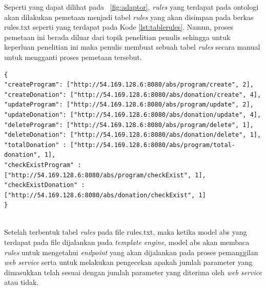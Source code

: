 Seperti yang dapat dilihat pada \pic~\ref{fig:adaptor}, \textit{rules} yang terdapat pada ontologi akan dilakukan pemetaan menjadi tabel \textit{rules} yang akan disimpan pada berkas rules.txt seperti yang terdapat pada Kode \ref{lst:tablerules}. Namun, proses pemetaan ini berada diluar dari topik penelitian penulis sehingga untuk keperluan penelitian ini maka penulis membuat sebuah tabel \textit{rules} secara manual untuk mengganti proses pemetaan tersebut.

\begin{minipage}{\linewidth}
\begin{lstlisting}[caption={Contoh tabel \textit{rules}},label={lst:tablerules}]
{
"createProgram": ["http://54.169.128.6:8080/abs/program/create", 2],
"createDonation": ["http://54.169.128.6:8080/abs/donation/create", 4],
"updateProgram": ["http://54.169.128.6:8080/abs/program/update", 2],
"updateDonation": ["http://54.169.128.6:8080/abs/donation/update", 4],
"deleteProgram": ["http://54.169.128.6:8080/abs/program/delete", 1],
"deleteDonation": ["http://54.169.128.6:8080/abs/donation/delete", 1],
"totalDonation" : ["http://54.169.128.6:8080/abs/program/total-donation", 1],
"checkExistProgram" : ["http://54.169.128.6:8080/abs/program/checkExist", 1],
"checkExistDonation" : ["http://54.169.128.6:8080/abs/donation/checkExist", 1]
}
\end{lstlisting}
\end{minipage} \\

Setelah terbentuk tabel \textit{rules} pada file rules.txt, maka ketika model abs yang terdapat pada file dijalankan pada \textit{template engine}, model abs akan membaca \textit{rules} untuk mengetahui \textit{endpoint} yang akan dijalankan pada proses pemanggilan \textit{web service} serta untuk melakukan pengecekan apakah jumlah parameter yang dimasukkan telah sesuai dengan jumlah parameter yang diterima oleh \textit{web service} atau tidak.